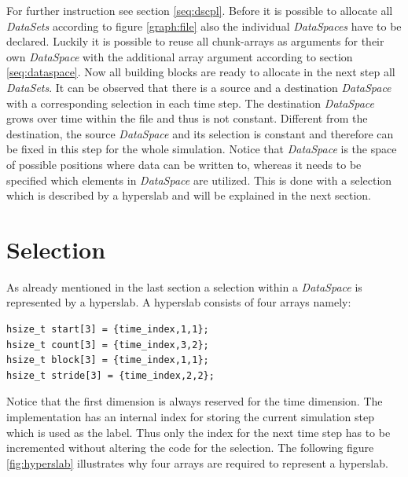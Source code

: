 For further instruction see section \ref{seq:dscpl}. Before it is possible to allocate all \textit{DataSets} according to figure \ref{graph:file} also the individual \textit{DataSpaces} have to be declared. Luckily it is possible to reuse all chunk-arrays as arguments for their own \textit{DataSpace} with the additional array argument according to section \ref{seq:dataspace}. Now all building blocks are ready to allocate in the next step all \textit{DataSets}. It can be observed that there is a source and a destination \textit{DataSpace} with a corresponding selection in each time step. The destination \textit{DataSpace} grows over time within the file and thus is not constant. Different from the destination, the source \textit{DataSpace} and its selection is constant and therefore can be fixed in this step for the whole simulation. Notice that \textit{DataSpace} is the space of possible positions where data can be written to, whereas it needs to be specified which elements in \textit{DataSpace} are utilized. This is done with a selection which is described by a hyperslab and will be explained in the next section.

\section{Selection}
\label{seq:selection}
As already mentioned in the last section a selection within a \textit{DataSpace} is represented by a hyperslab. A hyperslab consists of four arrays namely:
\begin{lstlisting}
hsize_t start[3] = {time_index,1,1};
hsize_t count[3] = {time_index,3,2};
hsize_t block[3] = {time_index,1,1};
hsize_t stride[3] = {time_index,2,2};
\end{lstlisting}
Notice that the first dimension is always reserved for the time dimension. The implementation has an internal index for storing the current simulation step which is used as the label. Thus only the index for the next time step has to be incremented without altering the code for the selection. The following figure \ref{fig:hyperslab} illustrates why four arrays are required to represent a hyperslab.

